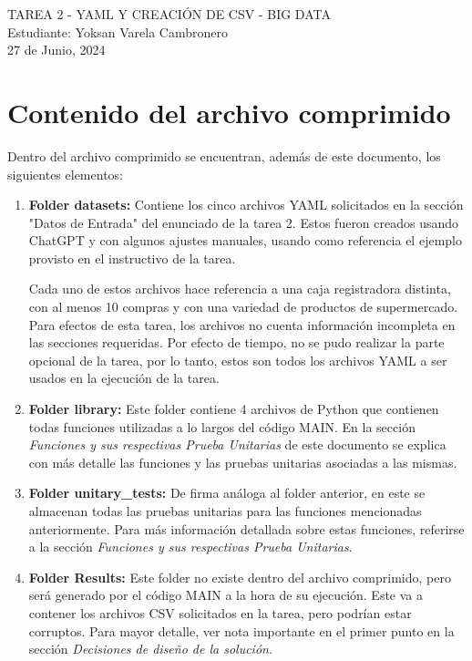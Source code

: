 \documentclass[a4paper]{article}
\begin{document}
\begin{center}
\large{TAREA 2 - YAML Y CREACI\'{O}N DE CSV - BIG DATA}\\
\small{Estudiante: Yoksan Varela Cambronero}\\
\small{27 de Junio, 2024}
\end{center}

\section{Contenido del archivo comprimido}
Dentro del archivo comprimido se encuentran, adem\'{a}s de este documento, los siguientes elementos:
\begin{enumerate}
    \item \textbf{Folder datasets:} Contiene los cinco archivos YAML solicitados en la secci\'{o}n "Datos de Entrada" del enunciado de la tarea 2. Estos fueron creados usando ChatGPT y con algunos ajustes manuales, usando como referencia el ejemplo provisto en el instructivo de la tarea.

    Cada uno de estos archivos hace referencia a una caja registradora distinta, con al menos 10 compras y con una variedad de productos de supermercado. Para efectos de esta tarea, los archivos no cuenta informaci\'{o}n incompleta en las secciones requeridas. Por efecto de tiempo, no se pudo realizar la parte opcional de la tarea, por lo tanto, estos son todos los archivos YAML a ser usados en la ejecuci\'{o}n de la tarea.
    
    \item \textbf{Folder library:} Este folder contiene 4 archivos de Python que contienen todas funciones utilizadas a lo largos del c\'{o}digo MAIN. En la secci\'{o}n \textit{Funciones y sus respectivas Prueba Unitarias} de este documento se explica con m\'{a}s detalle las funciones y las pruebas unitarias asociadas a las mismas. 
    
    \item \textbf{Folder unitary\_tests:} De firma an\'{a}loga al folder anterior, en este se almacenan todas las pruebas unitarias para las funciones mencionadas anteriormente. Para m\'{a}s informaci\'{o}n detallada sobre estas funciones, referirse a la secci\'{o}n \textit{Funciones y sus respectivas Prueba Unitarias}.

    \item \textbf{Folder Results:} Este folder no existe dentro del archivo comprimido, pero ser\'{a} generado por el c\'{o}digo MAIN a la hora de su ejecuci\'{o}n. Este va a contener los archivos CSV solicitados en la tarea, pero podr\'{i}an estar corruptos. Para mayor detalle, ver nota importante en el primer punto en la secci\'{o}n \textit{Decisiones de dise\~{n}o de la soluci\'{o}n}.
    

\end{enumerate}
\end{document}
